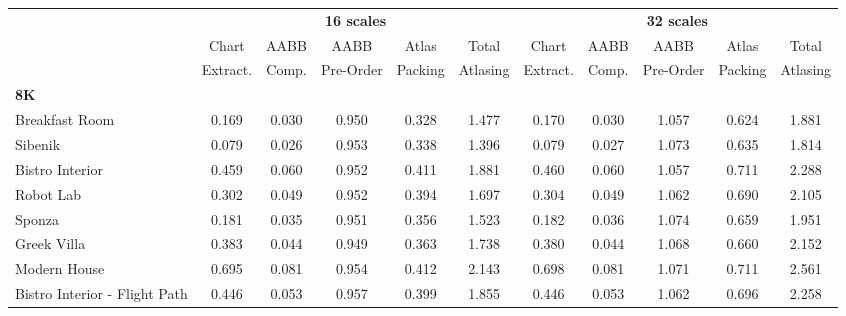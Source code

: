 \begin{table*}
\scriptsize
\setlength{\tabcolsep}{2pt}
\centering
\tiny
\begin{tabular}{lccccc|ccccc}
& \multicolumn{5}{c|}{\textbf{16 scales}} & \multicolumn{5}{c}{\textbf{32 scales}} \\
& Chart              & AABB           & AABB           & Atlas          & Total          & Chart              & AABB           & AABB           & Atlas          & Total          \\
& Extract.           & Comp.          & Pre-Order      & Packing        & Atlasing       & Extract.           & Comp.          & Pre-Order      & Packing        & Atlasing       \\
\hline
\textbf{8K}  & & & & & & & & & & \\
Breakfast Room                & 0.169              & 0.030          & 0.950          & 0.328          & 1.477          & 0.170              & 0.030          & 1.057          & 0.624          & 1.881          \\
Sibenik                       & 0.079              & 0.026          & 0.953          & 0.338          & 1.396          & 0.079              & 0.027          & 1.073          & 0.635          & 1.814          \\
Bistro Interior               & 0.459              & 0.060          & 0.952          & 0.411          & 1.881          & 0.460              & 0.060          & 1.057          & 0.711          & 2.288          \\
Robot Lab                     & 0.302              & 0.049          & 0.952          & 0.394          & 1.697          & 0.304              & 0.049          & 1.062          & 0.690          & 2.105          \\
Sponza                        & 0.181              & 0.035          & 0.951          & 0.356          & 1.523          & 0.182              & 0.036          & 1.074          & 0.659          & 1.951          \\
Greek Villa                   & 0.383              & 0.044          & 0.949          & 0.363          & 1.738          & 0.380              & 0.044          & 1.068          & 0.660          & 2.152          \\
Modern House                  & 0.695              & 0.081          & 0.954          & 0.412          & 2.143          & 0.698              & 0.081          & 1.071          & 0.711          & 2.561          \\
Bistro Interior - Flight Path & 0.446              & 0.053          & 0.957          & 0.399          & 1.855          & 0.446              & 0.053          & 1.062          & 0.696          & 2.258          \\

\end{tabular}
\end{table*}
